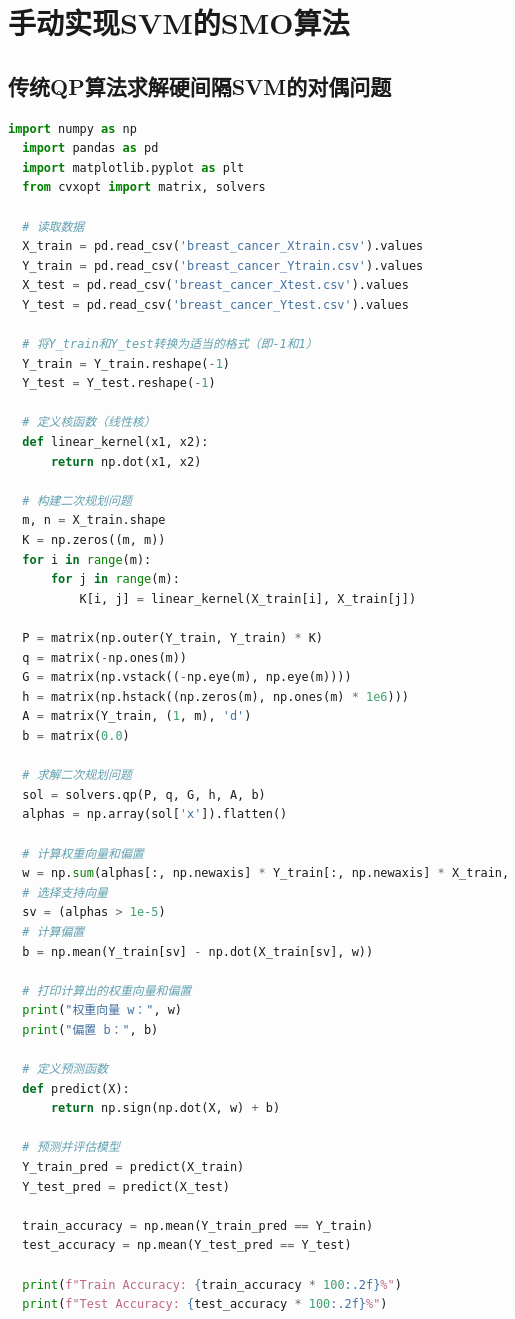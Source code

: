 \documentclass[12pt]{article}
\begin{document}
\section{手动实现SVM的SMO算法}
\subsection{传统QP算法求解硬间隔SVM的对偶问题}
\begin{lstlisting}[language=Python]
  import numpy as np
  import pandas as pd
  import matplotlib.pyplot as plt
  from cvxopt import matrix, solvers
  
  # 读取数据
  X_train = pd.read_csv('breast_cancer_Xtrain.csv').values
  Y_train = pd.read_csv('breast_cancer_Ytrain.csv').values
  X_test = pd.read_csv('breast_cancer_Xtest.csv').values
  Y_test = pd.read_csv('breast_cancer_Ytest.csv').values
  
  # 将Y_train和Y_test转换为适当的格式（即-1和1）
  Y_train = Y_train.reshape(-1)
  Y_test = Y_test.reshape(-1)
  
  # 定义核函数（线性核）
  def linear_kernel(x1, x2):
      return np.dot(x1, x2)
  
  # 构建二次规划问题
  m, n = X_train.shape
  K = np.zeros((m, m))
  for i in range(m):
      for j in range(m):
          K[i, j] = linear_kernel(X_train[i], X_train[j])
  
  P = matrix(np.outer(Y_train, Y_train) * K)
  q = matrix(-np.ones(m))
  G = matrix(np.vstack((-np.eye(m), np.eye(m))))
  h = matrix(np.hstack((np.zeros(m), np.ones(m) * 1e6)))
  A = matrix(Y_train, (1, m), 'd')
  b = matrix(0.0)
  
  # 求解二次规划问题
  sol = solvers.qp(P, q, G, h, A, b)
  alphas = np.array(sol['x']).flatten()
  
  # 计算权重向量和偏置
  w = np.sum(alphas[:, np.newaxis] * Y_train[:, np.newaxis] * X_train, axis=0)
  # 选择支持向量
  sv = (alphas > 1e-5)
  # 计算偏置
  b = np.mean(Y_train[sv] - np.dot(X_train[sv], w))
  
  # 打印计算出的权重向量和偏置
  print("权重向量 w：", w)
  print("偏置 b：", b)
  
  # 定义预测函数
  def predict(X):
      return np.sign(np.dot(X, w) + b)
  
  # 预测并评估模型
  Y_train_pred = predict(X_train)
  Y_test_pred = predict(X_test)
  
  train_accuracy = np.mean(Y_train_pred == Y_train)
  test_accuracy = np.mean(Y_test_pred == Y_test)
  
  print(f"Train Accuracy: {train_accuracy * 100:.2f}%")
  print(f"Test Accuracy: {test_accuracy * 100:.2f}%")
  

\end{lstlisting}
\end{document}
